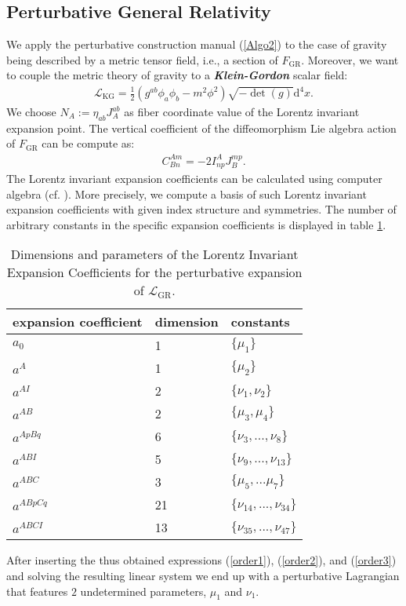 \documentclass[%
preprint,
nofootinbib,
amsmath,amssymb,
aps,
prd,
floatfix,
]{revtex4-2}
\begin{document}
\subsection{Perturbative General Relativity}
We apply the perturbative construction manual (\ref{Algo2}) to the case of gravity being described by a metric tensor field, i.e., a section of $F_{\text{GR}}$. 
Moreover, we want to couple the metric theory of gravity to a \textit{\textbf{Klein-Gordon}} scalar field:
\begin{align}\label{KGL}
    \mathcal{L}_{\text{KG}} = \frac{1}{2} \left ( g^{ab} \phi_a \phi_b - m^2 \phi^2\right )\sqrt{-\operatorname{det}(g)} \mathrm{d}^4x.
\end{align}
We choose $N_A := \eta_{ab} J_A^{ab} $ as fiber coordinate value of the Lorentz invariant expansion point. The vertical coefficient of the diffeomorphism Lie algebra action of $F_{\text{GR}}$ can be compute as:
\begin{align}
    C^{Am}_{Bn} = -2 I^A_{np} J_B^{mp}.
\end{align}
The Lorentz invariant expansion coefficients can be calculated using computer algebra (cf. \cite{sparse-tensor}). More precisely, we compute a basis of such Lorentz invariant expansion coefficients with given index structure and symmetries. The number of arbitrary constants in the
specific expansion coefficients is displayed in table \ref{GRExp}.
\begin{table}
\centering 
\begin{tabular}{lll}\toprule
    expansion coefficient & dimension & constants   \\ \midrule
    $a_0$ & 1 & $\{\mu_1\}$ \\
    $a^A$ & 1 & $\{\mu_2\}$ \\
    $a^{AI}$ & 2 & $\{\nu_1, \nu_2\}$ \\
    $a^{AB}$ & 2 & $\{\mu_3, \mu_4 \} $ \\
    $a^{ApBq}$ & 6 & $\{\nu_3,...,\nu_8\}$ \\
    $a^{ABI}$ & 5 & $\{ \nu_9,...,\nu_{13} \}$ \\
    $a^{ABC}$ & 3 & $\{ \mu_5,...\mu_7 \}$\\
    $a^{ABpCq}$ & 21 & $\{\nu_{14},...,\nu_{34} \}$ \\
    $a^{ABCI}$ & 13 & $\{ \nu_{35},...,\nu_{47}\}$\\ \bottomrule
\end{tabular}
\caption{Dimensions and parameters of the Lorentz Invariant Expansion Coefficients for the perturbative expansion of $\mathcal{L}_{\text{GR}}$.}\label{GRExp}
\end{table}
After inserting the thus obtained expressions (\ref{order1}), (\ref{order2}), and (\ref{order3}) and solving the resulting linear system we end up with a perturbative Lagrangian that features $2$ undetermined parameters, $\mu_1$ and $\nu_1$. 
\end{document}

